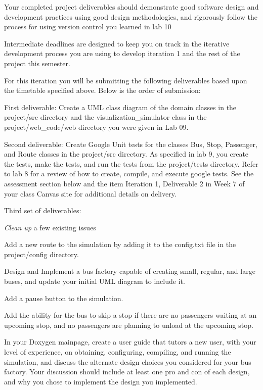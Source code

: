 Your completed project deliverables should demonstrate good software design and development practices using good design methodologies, and rigorously follow the process for using version control you learned in lab 10

Intermediate deadlines are designed to keep you on track in the iterative development process you are using to develop iteration 1 and the rest of the project this semester.

For this iteration you will be submitting the following deliverables based upon the timetable specified above. Below is the order of submission\+:


\begin{DoxyEnumerate}
\item First deliverable\+: Create a U\+ML class diagram of the domain classes in the {\ttfamily project/src} directory and the visualization\+\_\+simulator class in the {\ttfamily project/web\+\_\+code/web} directory you were given in Lab 09.
\item Second deliverable\+: Create Google Unit tests for the classes \textquotesingle{}Bus\textquotesingle{}, \textquotesingle{}Stop\textquotesingle{}\textquotesingle{}, \textquotesingle{}Passenger\textquotesingle{}, and \textquotesingle{}Route\textquotesingle{} classes in the {\ttfamily project/src} directory. As specified in lab 9, you create the tests, make the tests, and run the tests from the {\ttfamily project/tests} directory. Refer to lab 8 for a review of how to create, compile, and execute google tests. See the assessment section below and the item Iteration 1, Deliverable 2 in Week 7 of your class Canvas site for additional details on delivery.
\item Third set of deliverables\+:
\begin{DoxyEnumerate}
\item {\itshape Clean up} a few existing issues
\item Add a new route to the simulation by adding it to the config.\+txt file in the {\ttfamily project/config} directory.
\item Design and Implement a bus factory capable of creating small, regular, and large buses, and update your initial U\+ML diagram to include it.
\item Add a pause button to the simulation.
\item Add the ability for the bus to skip a stop if there are no passengers waiting at an upcoming stop, and no passengers are planning to unload at the upcoming stop.
\item In your Doxygen mainpage, create a user guide that tutors a new user, with your level of experience, on obtaining, configuring, compiling, and running the simulation, and discuss the alternate design choices you considered for your bus factory. Your discussion should include at least one pro and con of each design, and why you chose to implement the design you implemented.

\end{DoxyEnumerate}
\end{DoxyEnumerate}
